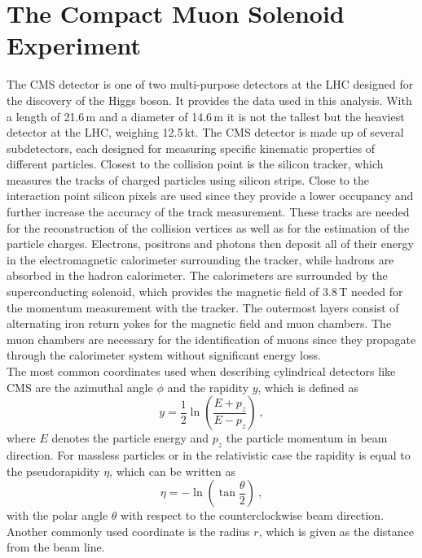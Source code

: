\section{The Compact Muon Solenoid Experiment}
The CMS detector is one of two multi-purpose detectors at the LHC designed for the discovery of the Higgs boson. It provides the data used in this analysis. With a length of 21.6\,m and a diameter of 14.6\,m it is not the tallest but the heaviest detector at the LHC, weighing 12.5\,kt. The CMS detector is made up of several subdetectors, each designed for measuring specific kinematic properties of different particles. Closest to the collision point is the silicon tracker, which measures the tracks of charged particles using silicon strips. Close to the interaction point silicon pixels are used since they provide a lower occupancy and further increase the accuracy of the track measurement. These tracks are needed for the reconstruction of the collision vertices as well as for the estimation of the particle charges. Electrons, positrons and photons then deposit all of their energy in the electromagnetic calorimeter surrounding the tracker, while hadrons are absorbed in the hadron calorimeter. The calorimeters are surrounded by the superconducting solenoid, which provides the magnetic field of 3.8\,T needed for the momentum measurement with the tracker. The outermost layers consist of alternating iron return yokes for the magnetic field and muon chambers. The muon chambers are necessary for the identification of muons since they propagate through the calorimeter system without significant energy loss.\\

\noindent The most common coordinates used when describing cylindrical detectors like CMS are the azimuthal angle $\phi$ and the rapidity $y$, which is defined as
\begin{equation}
y = \frac{1}{2} \ln \left( \frac{E+p_z}{E-p_z} \right) ~,
\end{equation}
where $E$ denotes the particle energy and $p_z$ the particle momentum in beam direction. For massless particles or in the relativistic case the rapidity is equal to the pseudorapidity $\eta$, which can be written as
\begin{equation}
\eta = -\ln \left( \tan \frac{\theta}{2} \right) ~,
\end{equation}
with the polar angle $\theta$ with respect to the counterclockwise beam direction. Another commonly used coordinate is the radius $r$, which is given as the distance from the beam line.\\

